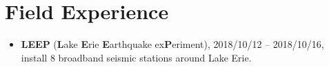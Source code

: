 \section*{Field Experience}

\begin{itemize}
\item \textbf{LEEP} (\textbf{L}ake \textbf{E}rie \textbf{E}arthquake ex\textbf{P}eriment),
      2018/10/12 -- 2018/10/16, install 8 broadband seismic stations around Lake Erie.
\end{itemize}
